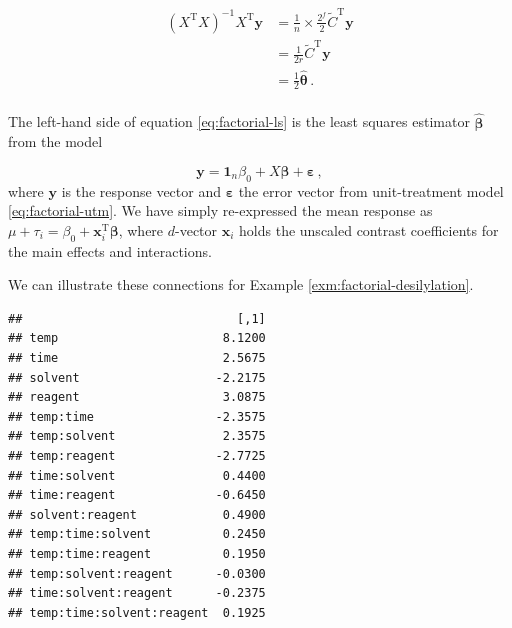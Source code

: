 \documentclass[
]{book}
\newenvironment{Shaded}{\begin{snugshade}}{\end{snugshade}}
\newcommand{\DecValTok}[1]{\textcolor[rgb]{0.00,0.00,0.81}{#1}}
\newcommand{\FunctionTok}[1]{\textcolor[rgb]{0.00,0.00,0.00}{#1}}
\newcommand{\NormalTok}[1]{#1}
\newcommand{\OtherTok}[1]{\textcolor[rgb]{0.56,0.35,0.01}{#1}}
\newcommand{\SpecialCharTok}[1]{\textcolor[rgb]{0.00,0.00,0.00}{#1}}
\theoremstyle{definition}
\theoremstyle{definition}
\theoremstyle{definition}
\theoremstyle{definition}
\theoremstyle{remark}
\begin{document}
\begin{align}
\left(X^{\mathrm{T}}X\right)^{-1}X^{\mathrm{T}}\boldsymbol{y}& = \frac{1}{n} \times \frac{2^f}{2}\tilde{C}^{\mathrm{T}}\boldsymbol{y}\label{eq:factorial-ls}\\
& = \frac{1}{2r}\tilde{C}^{\mathrm{T}}\boldsymbol{y}\\
& = \frac{1}{2}\hat{\boldsymbol{\theta}}\,. \\
\end{align}

The left-hand side of equation \eqref{eq:factorial-ls} is the least squares estimator \(\hat{\boldsymbol{\beta}}\) from the model

\[
\boldsymbol{y}= \boldsymbol{1}_n\beta_0 + X\boldsymbol{\beta} + \boldsymbol{\varepsilon}\,,
\]
where \(\boldsymbol{y}\) is the response vector and \(\boldsymbol{\varepsilon}\) the error vector from unit-treatment model \eqref{eq:factorial-utm}. We have simply re-expressed the mean response as \(\mu + \tau_i = \beta_0 + \boldsymbol{x}_i^{\mathrm{T}}\boldsymbol{\beta}\), where \(d\)-vector \(\boldsymbol{x}_i\) holds the unscaled contrast coefficients for the main effects and interactions.

We can illustrate these connections for Example \ref{exm:factorial-desilylation}.

\begin{Shaded}
\end{Shaded}

\begin{verbatim}
##                              [,1]
## temp                       8.1200
## time                       2.5675
## solvent                   -2.2175
## reagent                    3.0875
## temp:time                 -2.3575
## temp:solvent               2.3575
## temp:reagent              -2.7725
## time:solvent               0.4400
## time:reagent              -0.6450
## solvent:reagent            0.4900
## temp:time:solvent          0.2450
## temp:time:reagent          0.1950
## temp:solvent:reagent      -0.0300
## time:solvent:reagent      -0.2375
## temp:time:solvent:reagent  0.1925
\end{verbatim}
\end{document}
